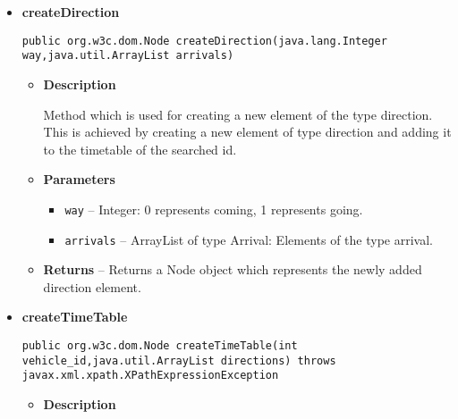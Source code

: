 \documentclass[11pt,a4paper]{report}
\begin{document}
{{{{{{{{{\begin{itemize}
{\begin{itemize}
{Method which is used for creating a new element of the type arrival. This is achieved by creating a new element of type arrival and adding it to the timetable of the searched id.
}
\item{
{\bf  Parameters}
  \begin{itemize}
   \item{
\texttt{station\_id} -- int: id of the station. Example: 4483.}
   \item{
\texttt{station\_name} -- String: Name of the station. Example: Gara de Nord.}
   \item{
\texttt{arrives\_in} -- Time: Time of arrival. Example: 16:05}
  \end{itemize}
}%
\item{{\bf  Returns} -- 
Returns a Node object which represents the newly added arrival element. 
}%
\end{itemize}
}%
\item{ 
\hypertarget{core.TimeTablesInteractor.createDirection(java.lang.Integer, java.util.ArrayList)}{{\bf  createDirection}\\}
\begin{lstlisting}[frame=none]
public org.w3c.dom.Node createDirection(java.lang.Integer way,java.util.ArrayList arrivals)\end{lstlisting} %
\begin{itemize}
\item{
{\bf  Description}

Method which is used for creating a new element of the type direction. This is achieved by creating a new element of type direction and adding it to the timetable of the searched id.
}
\item{
{\bf  Parameters}
  \begin{itemize}
   \item{
\texttt{way} -- Integer: 0 represents coming, 1 represents going.}
   \item{
\texttt{arrivals} -- ArrayList of type Arrival: Elements of the type arrival.}
  \end{itemize}
}%
\item{{\bf  Returns} -- 
Returns a Node object which represents the newly added direction element. 
}%
\end{itemize}
}%
\item{ 
\hypertarget{core.TimeTablesInteractor.createTimeTable(int, java.util.ArrayList)}{{\bf  createTimeTable}\\}
\begin{lstlisting}[frame=none]
public org.w3c.dom.Node createTimeTable(int vehicle_id,java.util.ArrayList directions) throws javax.xml.xpath.XPathExpressionException\end{lstlisting} %
\begin{itemize}
\item{
{\bf  Description}

}
\end{itemize}}
\end{itemize}}}}}}}}}}
\end{document}

